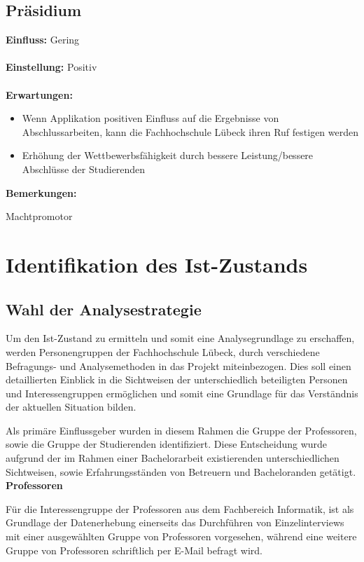 \documentclass{scrreprt}
\begin{document}
\subsection{Präsidium}
\textbf{Einfluss:} Gering\\\\
\textbf{Einstellung:} Positiv\\\\
\textbf{Erwartungen:}
\begin{itemize}
\item Wenn Applikation positiven Einfluss auf die Ergebnisse von Abschlussarbeiten, kann die Fachhochschule Lübeck ihren Ruf festigen werden
\item Erhöhung der Wettbewerbsfähigkeit durch bessere Leistung/bessere Abschlüsse der Studierenden
\end{itemize}
\textbf{Bemerkungen:}\par Machtpromotor
\newpage

\section{Identifikation des Ist-Zustands}

\subsection{Wahl der Analysestrategie}
\par Um den Ist-Zustand zu ermitteln und somit eine Analysegrundlage zu erschaffen, werden Personengruppen der Fachhochschule Lübeck, durch verschiedene Befragungs- und Analysemethoden in das Projekt miteinbezogen. Dies soll einen detaillierten Einblick in die Sichtweisen der unterschiedlich beteiligten Personen und Interessengruppen ermöglichen und somit eine Grundlage für das Verständnis der aktuellen Situation bilden.

\par Als primäre Einflussgeber wurden in diesem Rahmen die Gruppe der Professoren, sowie die Gruppe der Studierenden identifiziert. Diese Entscheidung wurde aufgrund der im Rahmen einer Bachelorarbeit  existierenden unterschiedlichen Sichtweisen, sowie Erfahrungsständen von Betreuern und Bacheloranden getätigt. \\

\textbf{Professoren}
\par Für die Interessengruppe der Professoren aus dem Fachbereich Informatik, ist als Grundlage der Datenerhebung einerseits das Durchführen von Einzelinterviews mit einer ausgewählten Gruppe von Professoren vorgesehen, während eine weitere Gruppe von Professoren schriftlich per E-Mail befragt wird. 
\end{document}
